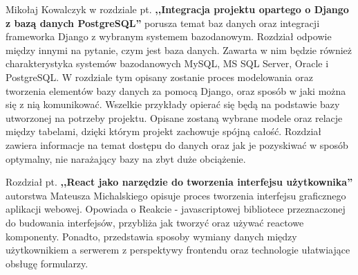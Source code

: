 \documentclass[oneside,polski,logo,indent]{amuthesis}
\begin{document}
Mikołaj Kowalczyk w rozdziale pt. \textbf{,,Integracja projektu opartego o Django z bazą danych PostgreSQL''} porusza temat baz danych oraz integracji frameworka Django z wybranym systemem bazodanowym. Rozdział odpowie między innymi na pytanie,  czym jest baza danych.  Zawarta w nim będzie również charakterystyka systemów bazodanowych MySQL, MS SQL Server, Oracle i PostgreSQL. W rozdziale tym opisany zostanie proces modelowania oraz tworzenia elementów bazy danych za pomocą Django, oraz sposób w jaki można się z nią komunikować. Wszelkie przykłady opierać się będą na podstawie bazy utworzonej na potrzeby projektu. Opisane zostaną wybrane modele oraz relacje między tabelami, dzięki którym projekt zachowuje spójną całość. Rozdział zawiera informacje na temat dostępu do danych oraz jak je pozyskiwać w sposób optymalny, nie narażający bazy na zbyt duże obciążenie.
 
Rozdział pt. \textbf{,,React jako narzędzie do tworzenia interfejsu użytkownika''} autorstwa Mateusza Michalskiego opisuje proces tworzenia interfejsu graficznego aplikacji webowej. Opowiada o Reakcie - javascriptowej bibliotece przeznaczonej do budowania interfejsów, przybliża jak tworzyć oraz używać reactowe komponenty. Ponadto, przedstawia sposoby wymiany danych między użytkownikiem a serwerem z perspektywy frontendu oraz technologie ułatwiające obsługę formularzy.
\end{document}
